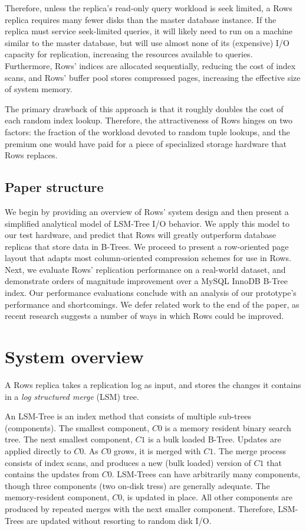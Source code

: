 \documentclass{sig-alternate-sigmod08}
\newcommand{\rows}{Rows\xspace}
\newcommand{\rowss}{Rows'\xspace}
\begin{document}
Therefore, unless the replica's read-only query workload is seek
limited, a \rows replica requires many fewer disks than the
master database instance.  If the replica must service seek-limited
queries, it will likely need to run on a machine similar to the master
database, but will use almost none of its (expensive) I/O capacity for
replication, increasing the resources available to queries.
Furthermore, \rowss indices are allocated sequentially, reducing the
cost of index scans, and \rowss buffer pool stores compressed
pages, increasing the effective size of system memory.

The primary drawback of this approach is that it roughly doubles the
cost of each random index lookup.  Therefore, the attractiveness of
\rows hinges on two factors: the fraction of the workload devoted to
random tuple lookups, and the premium one would have paid for a piece
of specialized storage hardware that \rows replaces.

\subsection{Paper structure}

We begin by providing an overview of \rowss system design and then
present a simplified analytical model of LSM-Tree I/O behavior.  We
apply this model to our test hardware, and predict that \rows will
greatly outperform database replicas that store data in B-Trees.  We
proceed to present a row-oriented page layout that adapts most
column-oriented compression schemes for use in \rows.  Next, we
evaluate \rowss replication performance on a real-world dataset, and
demonstrate orders of magnitude improvement over a MySQL InnoDB B-Tree
index.  Our performance evaluations conclude with an analysis
of our prototype's performance and shortcomings.  We defer
related work to the end of the paper, as recent research suggests
a number of ways in which \rows could be improved.

\section{System overview}

A \rows replica takes a replication log as input, and stores the
changes it contains in a {\em log structured merge} (LSM)
tree\cite{lsm}.

An LSM-Tree is an index method that consists of multiple sub-trees
(components).  The smallest component, $C0$ is a memory resident
binary search tree.  The next smallest component, $C1$ is a bulk
loaded B-Tree.  Updates are applied directly to $C0$.  As $C0$ grows,
it is merged with $C1$.  The merge process consists of index scans,
and produces a new (bulk loaded) version of $C1$ that contains the
updates from $C0$.  LSM-Trees can have arbitrarily many components,
though three components (two on-disk tress) are generally adequate.
The memory-resident component, $C0$, is updated in place.  All other
components are produced by repeated merges with the next smaller
component.  Therefore, LSM-Trees are updated without resorting to
random disk I/O.
\end{document}
